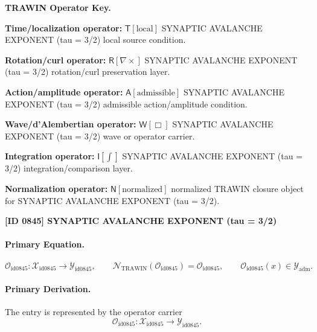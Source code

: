\par\vspace{0.45\baselineskip}
\noindent\begin{minipage}[t]{\linewidth}
\begingroup
\small
\raggedright
\textbf{TRAWIN Operator Key.}\par
\noindent\textbf{Time/localization operator:} $\mathsf{T}\!\left[\mathrm{local}\right]$ SYNAPTIC AVALANCHE EXPONENT (tau = 3/2) local source condition.\par
\noindent\textbf{Rotation/curl operator:} $\mathsf{R}\!\left[\nabla\times\right]$ SYNAPTIC AVALANCHE EXPONENT (tau = 3/2) rotation/curl preservation layer.\par
\noindent\textbf{Action/amplitude operator:} $\mathsf{A}\!\left[\mathrm{admissible}\right]$ SYNAPTIC AVALANCHE EXPONENT (tau = 3/2) admissible action/amplitude condition.\par
\noindent\textbf{Wave/d'Alembertian operator:} $\mathsf{W}\!\left[\Box\right]$ SYNAPTIC AVALANCHE EXPONENT (tau = 3/2) wave or operator carrier.\par
\noindent\textbf{Integration operator:} $\mathsf{I}\!\left[\int\right]$ SYNAPTIC AVALANCHE EXPONENT (tau = 3/2) integration/comparison layer.\par
\noindent\textbf{Normalization operator:} $\mathsf{N}\!\left[\mathrm{normalized}\right]$ normalized TRAWIN closure object for SYNAPTIC AVALANCHE EXPONENT (tau = 3/2).\par
\endgroup
\end{minipage}

\clearpage
\noindent\textbf{[ID 0845] SYNAPTIC AVALANCHE EXPONENT (tau = 3/2)}\par
\vspace{0.35em}
\paragraph{Primary Equation.}
\[
\mathcal{O}_{\mathrm{id0845}}:\mathcal{X}_{\mathrm{id0845}}\longrightarrow \mathcal{Y}_{\mathrm{id0845}},\qquad
\mathcal{N}_{\mathrm{TRAWIN}}(\mathcal{O}_{\mathrm{id0845}})=\mathcal{O}_{\mathrm{id0845}},\qquad
\mathcal{O}_{\mathrm{id0845}}(x)\in\mathcal{Y}_{\mathrm{adm}}.
\]

\paragraph{Primary Derivation.} The entry is represented by the operator carrier\[
\mathcal{O}_{\mathrm{id0845}}:\mathcal{X}_{\mathrm{id0845}}\longrightarrow \mathcal{Y}_{\mathrm{id0845}}.
\]

